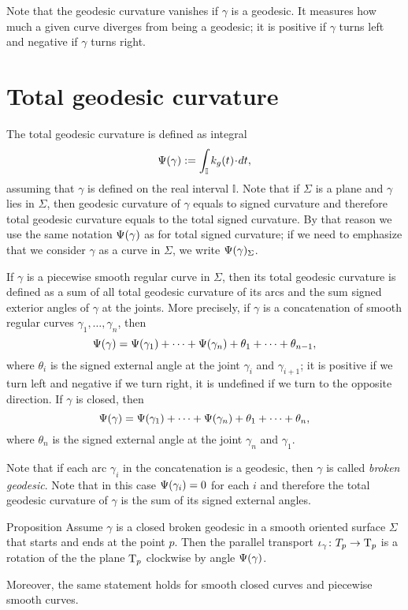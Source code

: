Note that the geodesic curvature vanishes if $\gamma$ is a geodesic. 
It measures how much a given curve diverges from being a geodesic;
it is positive if $\gamma$ turns left and negative if $\gamma$ turns right.

\section*{Total geodesic curvature}

The total geodesic curvature is defined as integral 
\[\tgc\gamma\df \int_{\mathbb{I}} k_g(t)\cdot dt,\]
assuming that $\gamma$ is defined on the real interval $\mathbb{I}$.
Note that if $\Sigma$ is a plane and $\gamma$ lies in $\Sigma$, then geodesic curvature of $\gamma$ equals to signed curvature and therefore total geodesic curvature equals to the total signed curvature.
By that reason we use the same notation $\Psi({\gamma})$ as for total signed curvature; if we need to emphasize that we consider $\gamma$ as a curve in $\Sigma$, we write $\Psi({\gamma})_\Sigma$.

If $\gamma$ is a piecewise smooth regular curve in $\Sigma$, then
its total geodesic curvature is defined as a sum of all total geodesic curvature of its arcs and the sum signed exterior angles of $\gamma$ at the joints.
More precisely, if $\gamma$ is a concatenation of smooth regular curves $\gamma_1,\dots,\gamma_n$, then
\[\Psi({\gamma})=\Psi({\gamma_1})+\dots+\Psi({\gamma_n})+\theta_1+\dots+\theta_{n-1},\]
where $\theta_i$ is the signed external angle at the joint $\gamma_i$ and $\gamma_{i+1}$; it is positive if we turn left and negative if we turn right, it is undefined if we turn to the opposite direction.
If $\gamma$ is closed, then 
\[\Psi({\gamma})=\Psi({\gamma_1})+\dots+\Psi({\gamma_n})+\theta_1+\dots+\theta_{n},\]
where $\theta_n$ is the signed external angle at the joint $\gamma_n$ and $\gamma_1$.

Note that if each arc $\gamma_i$ in the concatenation is a geodesic, then $\gamma$ is called \emph{broken geodesic}.
Note that in this case $\Psi({\gamma_i})=0$ for each $i$ and therefore the total geodesic curvature of $\gamma$ is the sum of its signed external angles.

\begin{thm}{Proposition}\label{prop:pt+tgc}
Assume $\gamma$ is a closed broken geodesic in a smooth oriented surface $\Sigma$ that starts and ends at the point $p$.
Then the parallel transport $\iota_\gamma\colon T_p\to\mathrm{T}_p$ is a rotation of the the plane $\mathrm{T}_p$ clockwise by angle $\Psi({\gamma})$.

Moreover, the same statement holds for smooth closed curves and piecewise smooth curves.
\end{thm}

